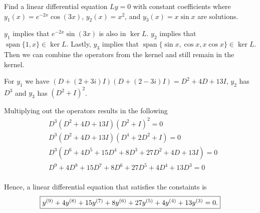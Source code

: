 Find a linear differential equation $Ly = 0$ with constant coefficients where $y_1(x) = e^{-2x}\cos (3x)$, $y_2(x) = x^2$, and $y_3(x) = x \sin x$ are solutions. 

\soln $y_1$ implies that $e^{-2x} \sin (3x)$ is also in $\ker L$. $y_2$ implies that $\operatorname{span}\{1, x\} \in \ker L$. Lastly, $y_3$ implies that $\operatorname{span}\{\sin x, \cos x, x \cos x\} \in \ker L$. Then we can combine the operators from the kernel and still remain in the kernel.

\nl For $y_1$ we have $(D+(2+3i)I)(D+(2-3i)I) = D^2 + 4D + 13I$, $y_2$ has $D^3$ and $y_3$ has $(D^2 + I)^2$.

\nl Multiplying out the operators results in the following 
\begin{align*}
    &D^3 (D^2 + 4D + 13I)(D^2 + I)^2 = 0\\
    &D^3 (D^2 + 4D + 13I)(D^4 + 2D^2 + I) = 0\\
    &D^3 (D^6 + 4D^5 + 15D^4 + 8D^3 + 27 D^2 + 4D + 13 I) = 0 \\
    &D^9 + 4D^8 + 15D^7 + 8D^6 + 27 D^5 + 4D^4 + 13 D^3 = 0 \\
\end{align*}

Hence, a linear differential equation that satisfies the constaints is $$\boxed{$$y^{(9)} + 4 y^{(8)} + 15 y^{(7)} + 8y^{(6)} + 27 y^{(5)} + 4y^{(4)} + 13 y^{(3)} = 0
.$$}$$